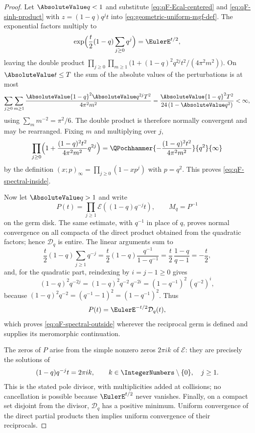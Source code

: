 \documentclass[11pt,a4paper,oneside,openany]{book}
\theoremstyle{definition}
\theoremstyle{remark}
\begin{document}
\begin{proof}
Let $\AbsoluteValue q<1$ and substitute \eqref{eq:qF-Ecal-centered} and
\eqref{eq:qF-sinh-product} with $z=(1-q)q^jt$ into \eqref{eq:geometric-uniform-mgf-def}.  The
exponential factors multiply to
\[
 \exp\Bigl(\frac t2(1-q)\sum_{j\ge0}q^{j}\Bigr)=\EulerE^{t/2},
\]
leaving the double product
$\prod_{j\ge0}\prod_{m\ge1}\bigl(1+(1-q)^2q^{2j}t^2/(4\pi^2m^2)\bigr)$.  On
$\AbsoluteValue t\le T$ the sum of the absolute values of the perturbations is at most
\[
 \sum_{j\ge0}\sum_{m\ge1}\frac{\AbsoluteValue{1-q}^2\AbsoluteValue q^{2j}T^2}{4\pi^2m^2}
 =\frac{\AbsoluteValue{1-q}^2T^2}{24\,(1-\AbsoluteValue q^2)}<\infty,
\]
using $\sum_mm^{-2}=\pi^2/6$.  The double product is therefore normally
convergent and may be rearranged.  Fixing $m$ and multiplying over $j$,
\[
 \prod_{j\ge0}\Bigl(1+\frac{(1-q)^2t^2}{4\pi^2m^2}q^{2j}\Bigr)
 =\QPochhammer{-\dfrac{(1-q)^2t^2}{4\pi^2m^2}}{q^{2}}{\infty}
\]
by the definition $(x;p)_\infty=\prod_{j\ge0}(1-xp^j)$ with $p=q^2$.  This proves
\eqref{eq:qF-spectral-inside}.

Now let $\AbsoluteValue q>1$ and write
\[
 P(t)=\prod_{j\ge1}\mathcal E((1-q)q^{-j}t),
 \qquad M_q=P^{-1}
\]
on the germ disk.  The same estimate, with $q^{-1}$ in place of $q$, proves
normal convergence on all compacta of the direct product obtained from the
quadratic factors; hence $\mathcal D_q$ is entire.  The linear arguments sum to
\[
 \frac t2(1-q)\sum_{j\ge1}q^{-j}
 =\frac t2(1-q)\frac{q^{-1}}{1-q^{-1}}
 =\frac t2\,\frac{1-q}{q-1}
 =-\frac t2,
\]
and, for the quadratic part, reindexing by $i=j-1\ge0$ gives
\[
 (1-q)^2q^{-2j}=(1-q)^2q^{-2}\,q^{-2i}=(1-q^{-1})^2\,(q^{-2})^{i},
\]
because $(1-q)^2q^{-2}=(q^{-1}-1)^2=(1-q^{-1})^2$.  Thus
\[
 P(t)=\EulerE^{-t/2}\mathcal D_q(t),
\]
which proves \eqref{eq:qF-spectral-outside} wherever the reciprocal germ is
defined and supplies its meromorphic continuation.

The zeros of $P$ arise from the simple nonzero zeros $2\pi i k$ of
$\mathcal E$: they are precisely the solutions of
\[
 (1-q)q^{-j}t=2\pi i k,
 \qquad k\in\IntegerNumbers\setminus\{0\},\quad j\ge1.
\]
This is the stated pole divisor, with multiplicities added at collisions; no
cancellation is possible because $\EulerE^{t/2}$ never vanishes.  Finally, on
a compact set disjoint from the divisor, $\mathcal D_q$ has a positive minimum.
Uniform convergence of the direct partial products then implies uniform
convergence of their reciprocals.
\end{proof}
\end{document}
